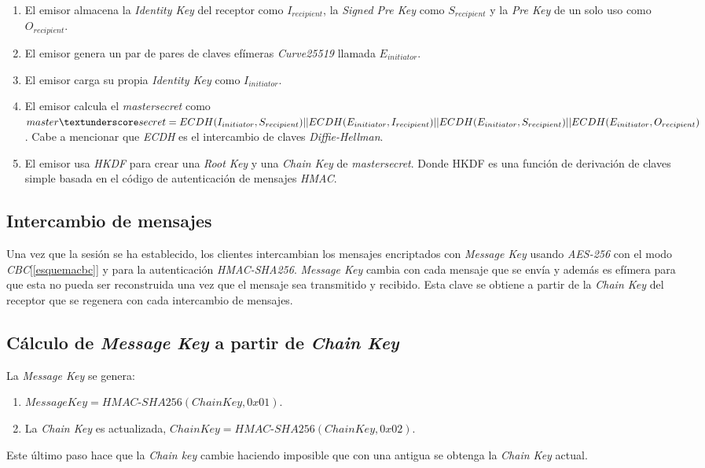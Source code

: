 \begin{enumerate}
	\item El emisor almacena la \emph{Identity Key} del receptor como $I_{recipient}$, la \emph{Signed Pre Key} como $S_{recipient}$ y la \emph{Pre Key} de un solo uso como $O_{recipient}$.
	\item El emisor genera un par de pares de claves efímeras \emph{Curve25519} llamada $E_{initiator}$.
	\item El emisor carga su propia \emph{Identity Key} como $I_{initiator}$.
	\item El emisor calcula el \emph{master\textunderscore secret} como $master\textunderscore secret = ECDH(I_{initiator}, S_{recipient}) ||\\ ECDH(E_{initiator}, I_{recipient}) || ECDH(E_{initiator}, S_{recipient}) || ECDH(E_{initiator}, O_{recipient})$. Cabe a mencionar que \emph{ECDH} es el intercambio de claves \emph{Diffie-Hellman}.
	\item El emisor usa \emph{HKDF} para crear una \emph{Root Key} y una \emph{Chain Key} de \emph{master\textunderscore secret}. Donde HKDF es una función de derivación de claves simple basada en el código de autenticación de mensajes \emph{HMAC}\cite{cekd}.
\end{enumerate}

\subsection{Intercambio de mensajes}
Una vez que la sesión se ha establecido, los clientes intercambian los mensajes encriptados con \emph{Message Key} usando \emph{AES-256} con el modo \emph{CBC}[\ref{esquemacbc}] y para la autenticación \emph{HMAC-SHA256}. \emph{Message Key} cambia con cada mensaje que se envía y además es efímera para que esta no pueda ser reconstruida una vez que el mensaje sea transmitido y recibido. Esta clave se obtiene a partir de la \emph{Chain Key} del receptor que se regenera con cada intercambio de mensajes. 

\subsection{Cálculo de \emph{Message Key} a partir de \emph{Chain Key}}
La \emph{Message Key} se genera:
\begin{enumerate}
	\item $Message Key = HMAC$-$SHA256(Chain Key, 0x01)$.
	\item La \emph{Chain Key} es actualizada, $Chain Key = HMAC$-$SHA256(Chain Key, 0x02)$.
\end{enumerate}
Este último paso hace que la \emph{Chain key} cambie haciendo imposible que con una  antigua se obtenga la \emph{Chain Key} actual.

